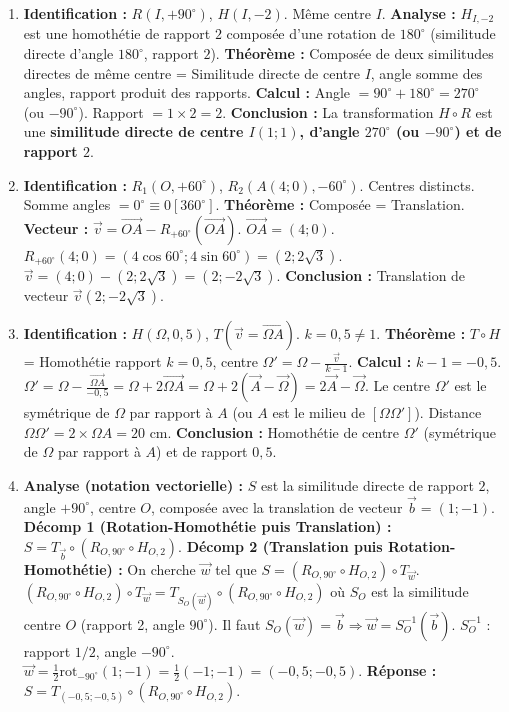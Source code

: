 \documentclass[11pt]{article}
\begin{document}
\begin{corrige}
\begin{enumerate}
    \item \textbf{Identification :} $R(I, +90^\circ)$, $H(I, -2)$. Même centre $I$.
    \textbf{Analyse :} $H_{I, -2}$ est une homothétie de rapport $2$ composée d'une rotation de $180^\circ$ (similitude directe d'angle $180^\circ$, rapport $2$).
    \textbf{Théorème :} Composée de deux similitudes directes de même centre = Similitude directe de centre $I$, angle somme des angles, rapport produit des rapports.
    \textbf{Calcul :} Angle $= 90^\circ + 180^\circ = 270^\circ$ (ou $-90^\circ$). Rapport $= 1 \times 2 = 2$.
    \textbf{Conclusion :} La transformation $H \circ R$ est une \textbf{similitude directe de centre $I(1;1)$, d'angle $270^\circ$ (ou $-90^\circ$) et de rapport $2$}.
    \item \textbf{Identification :} $R_1(O, +60^\circ)$, $R_2(A(4;0), -60^\circ)$. Centres distincts. Somme angles $= 0^\circ \equiv 0 [360^\circ]$.
    \textbf{Théorème :} Composée = Translation.
    \textbf{Vecteur :} $\vec{v} = \overrightarrow{OA} - R_{+60^\circ}(\overrightarrow{OA})$.
    $\overrightarrow{OA} = (4;0)$. $R_{+60^\circ}(4;0) = (4\cos 60^\circ; 4\sin 60^\circ) = (2; 2\sqrt{3})$.
    $\vec{v} = (4;0) - (2; 2\sqrt{3}) = (2; -2\sqrt{3})$.
    \textbf{Conclusion :} Translation de vecteur $\vec{v}(2; -2\sqrt{3})$.
    \item \textbf{Identification :} $H(\Omega, 0,5)$, $T(\vec{v}=\overrightarrow{\Omega A})$. $k=0,5 \neq 1$.
    \textbf{Théorème :} $T \circ H$ = Homothétie rapport $k=0,5$, centre $\Omega' = \Omega - \frac{\vec{v}}{k-1}$.
    \textbf{Calcul :} $k-1 = -0,5$. $\Omega' = \Omega - \frac{\overrightarrow{\Omega A}}{-0,5} = \Omega + 2\overrightarrow{\Omega A} = \Omega + 2(\vec{A} - \vec{\Omega}) = 2\vec{A} - \vec{\Omega}$.
    Le centre $\Omega'$ est le symétrique de $\Omega$ par rapport à $A$ (ou $A$ est le milieu de $[\Omega\Omega']$). Distance $\Omega\Omega' = 2 \times \Omega A = 20$ cm.
    \textbf{Conclusion :} Homothétie de centre $\Omega'$ (symétrique de $\Omega$ par rapport à $A$) et de rapport $0,5$.
    \item \textbf{Analyse (notation vectorielle) :} $S$ est la similitude directe de rapport $2$, angle $+90^\circ$, centre $O$, composée avec la translation de vecteur $\vec{b} = (1;-1)$.
    \textbf{Décomp 1 (Rotation-Homothétie puis Translation) :} $S = T_{\vec{b}} \circ (R_{O,90^\circ} \circ H_{O,2})$.
    \textbf{Décomp 2 (Translation puis Rotation-Homothétie) :} On cherche $\vec{w}$ tel que $S = (R_{O,90^\circ} \circ H_{O,2}) \circ T_{\vec{w}}$.
    $(R_{O,90^\circ} \circ H_{O,2}) \circ T_{\vec{w}} = T_{S_O(\vec{w})} \circ (R_{O,90^\circ} \circ H_{O,2})$ où $S_O$ est la similitude centre $O$ (rapport 2, angle $90^\circ$).
    Il faut $S_O(\vec{w}) = \vec{b} \Rightarrow \vec{w} = S_O^{-1}(\vec{b})$.
    $S_O^{-1}$ : rapport $1/2$, angle $-90^\circ$.
    $\vec{w} = \frac{1}{2} \text{rot}_{-90^\circ}(1;-1) = \frac{1}{2}(-1;-1) = (-0,5; -0,5)$.
    \textbf{Réponse :} $S = T_{(-0,5;-0,5)} \circ (R_{O,90^\circ} \circ H_{O,2})$.
\end{enumerate}
\end{corrige}
\end{document}

